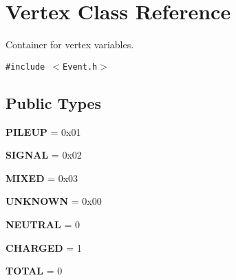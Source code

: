 \hypertarget{classVertex}{
\section{Vertex Class Reference}
\label{classVertex}
}
Container for vertex variables.  


{\tt \#include $<$Event.h$>$}

\subsection*{Public Types}
\begin{CompactItemize}
\item 
\hypertarget{classVertex_0d80a5c5ed3bd9be72a325aa448eca2591efdead99a528296866607ef71e381a}{
\textbf{PILEUP} = 0x01}
\label{classVertex_0d80a5c5ed3bd9be72a325aa448eca2591efdead99a528296866607ef71e381a}

\item 
\hypertarget{classVertex_0d80a5c5ed3bd9be72a325aa448eca25bf2b5581aadb28a4395b2fb07b593a2a}{
\textbf{SIGNAL} = 0x02}
\label{classVertex_0d80a5c5ed3bd9be72a325aa448eca25bf2b5581aadb28a4395b2fb07b593a2a}

\item 
\hypertarget{classVertex_0d80a5c5ed3bd9be72a325aa448eca25421d573c5503ef4f8059e028624a39bd}{
\textbf{MIXED} = 0x03}
\label{classVertex_0d80a5c5ed3bd9be72a325aa448eca25421d573c5503ef4f8059e028624a39bd}

\item 
\hypertarget{classVertex_0d80a5c5ed3bd9be72a325aa448eca253cdfabc16e7ced6ee3f45f623e8e97e2}{
\textbf{UNKNOWN} = 0x00}
\label{classVertex_0d80a5c5ed3bd9be72a325aa448eca253cdfabc16e7ced6ee3f45f623e8e97e2}

\item 
\hypertarget{classVertex_ca819079d9d940f86b1f6ea1469aed206f88d5ef761ccbf7e3d6da20f1955298}{
\textbf{NEUTRAL} = 0}
\label{classVertex_ca819079d9d940f86b1f6ea1469aed206f88d5ef761ccbf7e3d6da20f1955298}

\item 
\hypertarget{classVertex_ca819079d9d940f86b1f6ea1469aed2099d5b398bd82a88ab471313c95055c3f}{
\textbf{CHARGED} = 1}
\label{classVertex_ca819079d9d940f86b1f6ea1469aed2099d5b398bd82a88ab471313c95055c3f}

\item 
\hypertarget{classVertex_ca819079d9d940f86b1f6ea1469aed20406218fc13cebf8801b133f23a7cc58f}{
\textbf{TOTAL} = 0}
\label{classVertex_ca819079d9d940f86b1f6ea1469aed20406218fc13cebf8801b133f23a7cc58f}


\end{CompactItemize}
